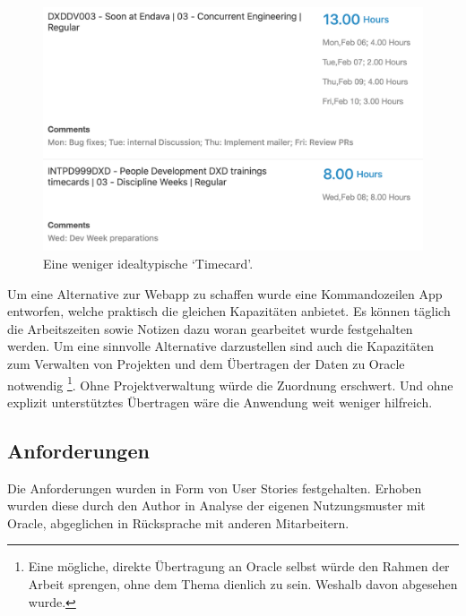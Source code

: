 \documentclass[oneside,bibliography=totocnumbered,BCOR=5mm]{scrbook}
\begin{document}
\begin{figure}[H]
  \centering
  \includegraphics[scale=0.25]{oracle-real.png}
  \caption{Eine weniger idealtypische `Timecard'.}
\end{figure}

Um eine Alternative zur Webapp zu schaffen wurde eine Kommandozeilen App
entworfen, welche praktisch die gleichen Kapazitäten anbietet. Es können täglich
die Arbeitszeiten sowie Notizen dazu woran gearbeitet wurde festgehalten
werden. Um eine sinnvolle Alternative darzustellen sind auch die Kapazitäten
zum Verwalten von Projekten und dem Übertragen der Daten zu Oracle notwendig
\footnote{Eine mögliche, direkte Übertragung an Oracle selbst würde den Rahmen
der Arbeit sprengen, ohne dem Thema dienlich zu sein. Weshalb davon abgesehen
wurde.}. Ohne Projektverwaltung würde die Zuordnung erschwert. Und ohne explizit
unterstütztes Übertragen wäre die Anwendung weit weniger hilfreich.

\subsection{Anforderungen}

Die Anforderungen wurden in Form von User Stories festgehalten. Erhoben wurden
diese durch den Author in Analyse der eigenen Nutzungsmuster mit Oracle,
abgeglichen in Rücksprache mit anderen Mitarbeitern.
\end{document}
